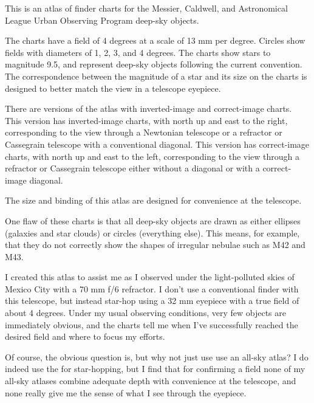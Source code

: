 This is an atlas of finder charts for the Messier, Caldwell, and Astronomical League Urban Observing Program deep-sky objects. 

The charts have a field of 4 degrees at a scale of 13 mm per degree. Circles show fields with diameters of 1, 2, 3, and 4 degrees. The charts show stars to magnitude 9.5, and represent deep-sky objects following the current convention. The correspondence between the magnitude of a star and its size on the charts is designed to better match the view in a telescope eyepiece.


There are versions of the atlas with inverted-image and correct-image charts. 
\ifinverted
This version has inverted-image charts, with north up and east to the right, corresponding to the view through a Newtonian telescope or a refractor or Cassegrain telescope with a conventional diagonal.
\else
This version has correct-image charts, with north up and east to the left, corresponding to the view through a refractor or Cassegrain telescope either without a diagonal or with a correct-image diagonal.
\fi

The size and binding of this atlas are designed for convenience at the telescope.

One flaw of these charts is that all deep-sky objects are drawn as either ellipses (galaxies and star clouds) or circles (everything else). This means, for example, that they do not correctly show the shapes of irregular nebulae such as M42 and M43.

\bigskip

I created this atlas to assist me as I observed under the light-polluted skies of Mexico City with a 70 mm f/6 refractor. I don't use a conventional finder with this telescope, but instead star-hop using a 32 mm eyepiece with a true field of about 4 degrees. Under my usual observing conditions, very few objects are immediately obvious, and the charts tell me when I've successfully reached the desired field and where to focus my efforts. 

Of course, the obvious question is, but why not just use use an all-sky atlas? I do indeed use the {\PSA} for star-hopping, but I find that for confirming a field none of my all-sky atlases combine adequate depth with convenience at the telescope, and none really give me the sense of what I see through the eyepiece. 


